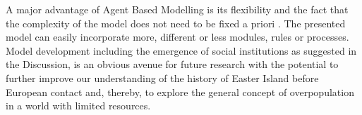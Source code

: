 A major advantage of Agent Based Modelling is its flexibility and the fact that the complexity of the model does not need to be fixed a priori \citep{Bonabeau2002}.
The presented model can easily incorporate more, different or less modules, rules or processes.
Model development including the emergence of social institutions as suggested in the Discussion, is an obvious avenue for future research with the potential to further improve our understanding of the history of Easter Island before European contact and, thereby, to explore the general concept of overpopulation in a world with limited resources.
